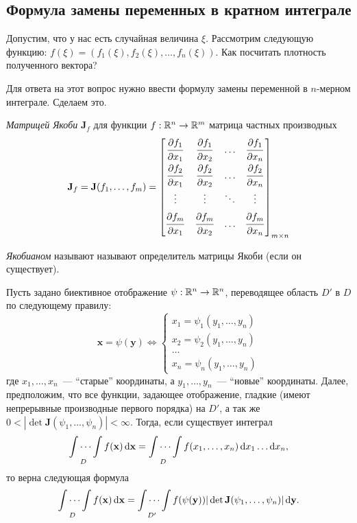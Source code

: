\subsection{Формула замены переменных в кратном интеграле}
Допустим, что у нас есть случайная величина \(\xi\). Рассмотрим следующую функцию: \(f(\xi) = (f_1(\xi), f_2(\xi), \dots, f_n(\xi))\). Как посчитать плотность полученного вектора?

Для ответа на этот вопрос нужно ввести формулу замены переменной в \(n\)-мерном интеграле. Сделаем это.
\begin{definition}
	\emph{Матрицей Якоби} \(\mathbf{J}_f\) для функции \(f : \mathbb{R}^n \to \mathbb{R}^m\) матрица частных производных
	\[
	\mathbf{J}_f = \mathbf{J}(f_1, \dots, f_m) =
	\begin{bmatrix}
	\dfrac{\strut\partial f_1}{\strut\partial x_1} & \dfrac{\strut\partial f_1}{\strut\partial x_2} & \ldots & \dfrac{\strut\partial f_1}{\strut\partial x_n} \\
	\dfrac{\strut\partial f_2}{\strut\partial x_1} & \dfrac{\strut\partial f_2}{\strut\partial x_2} & \ldots & \dfrac{\strut\partial f_2}{\strut\partial x_n} \\
	\vdots & \vdots & \ddots & \vdots \\[0.5em]
	\dfrac{\strut\partial f_m}{\strut\partial x_1} & \dfrac{\strut\partial f_m}{\strut\partial x_2} & \ldots & \dfrac{\strut\partial f_m}{\strut\partial x_n} \\
	\end{bmatrix}_{m \times n}
	\]
	
	\emph{Якобианом} называют называют определитель матрицы Якоби (если он существует).
\end{definition}
\begin{theorem}
	Пусть задано биективное отображение \(\psi : \mathbb{R}^n \to \mathbb{R}^n\), переводящее область \(D'\) в \(D\) по следующему правилу:
	\[ \mathbf{x} = \psi(\mathbf{y}) \iff
	\begin{cases}
	x_1 = \psi_1(y_1, \dots, y_n) \\
	x_2 = \psi_2(y_1, \dots, y_n) \\
	\dots \\
	x_n = \psi_n(y_1, \dots, y_n)
	\end{cases}
	\]
	где \(x_1, \dots, x_n\)~--- ``старые'' координаты, а \(y_1, \dots, y_n\)~--- ``новые'' координаты. Далее, предположим, что все функции, задающее отображение, гладкие (имеют непрерывные производные первого порядка) на \(D'\), а так же \(0 < |\det \mathbf{J}(\psi_1, \dots, \psi_n)| < \infty\). Тогда, если существует интеграл
	\[
	\idotsint\limits_{D} f(\mathbf{x})\mathop{}\!\mathrm{d}\mathbf{x} = \idotsint\limits_{D} f(x_1, \dots, x_n)\mathop{}\!\mathrm{d} x_1 \dots \mathop{}\!\mathrm{d} x_n,
	\]
	то верна следующая формула
	\[
	\idotsint\limits_{D} f(\mathbf{x})\mathop{}\!\mathrm{d}\mathbf{x} = \idotsint\limits_{D'} f(\psi(\mathbf{y}))|\det \mathbf{J}(\psi_1, \dots, \psi_n)|\mathop{}\!\mathrm{d}\mathbf{y}.
	\]
\end{theorem}
 
